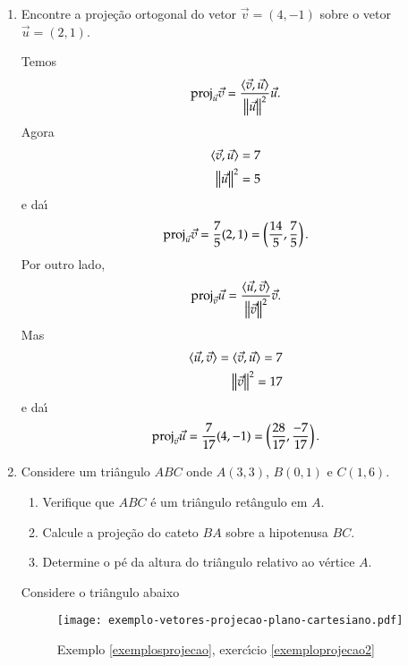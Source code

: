 \begin{exemplos}\label{exemplosprojecao}
  \begin{enumerate}
    \item Encontre a proje\c{c}\~ao ortogonal do vetor $\vec{v} = (4, -1)$ sobre o vetor $\vec{u} = (2, 1)$.
    \begin{solucao}
       Temos
       \[
          {\rm proj}_{\vec{u}}\vec{v} = \dfrac{\langle \vec{v}, \vec{u} \rangle}{\left\Vert{\vec{u}}\right\Vert^2}\vec{u}.
       \]
       Agora
       \begin{align*}
         \langle \vec{v}, \vec{u} \rangle = 7\\
         \left\Vert{\vec{u}}\right\Vert^2 = 5
       \end{align*}
       e da{\'\i}
       \[
          {\rm proj}_{\vec{u}}\vec{v} = \dfrac{7}{5}(2, 1) = \left(\dfrac{14}{5}, \dfrac{7}{5}\right).
       \]
       Por outro lado,
       \[
          {\rm proj}_{\vec{v}}\vec{u} = \dfrac{\langle \vec{u}, \vec{v} \rangle}{\left\Vert{\vec{v}}\right\Vert^2}\vec{v}.
       \]
       Mas
       \begin{align*}
         \langle \vec{u}, \vec{v} \rangle = \langle \vec{v}, \vec{u} \rangle = 7\\
         \left\Vert{\vec{v}}\right\Vert^2 = 17
       \end{align*}
       e da{\'\i}
       \[
          {\rm proj}_{\vec{v}}\vec{u} = \dfrac{7}{17}(4, -1) = \left(\dfrac{28}{17}, \dfrac{-7}{17}\right).
       \]
     \end{solucao} 
     \item Considere um tri\^angulo $ABC$ onde $A(3,3)$, $B(0,1)$ e $C(1,6)$.
     \begin{enumerate}\label{exemploprojecao2}
       \item Verifique que $ABC$ \'e um tri\^angulo ret\^angulo em $A$.
       \item Calcule a proje\c{c}\~ao do cateto $BA$ sobre a hipotenusa $BC$.
       \item Determine o p\'e da altura do tri\^angulo relativo ao v\'ertice $A$.
     \end{enumerate}
     \begin{solucao}
       Considere o tri\^angulo abaixo
       \begin{figure}[!h]
        \centering
        \caption{Exemplo \ref{exemplosprojecao}, exerc{\'\i}cio \ref{exemploprojecao2}}
        \texttt{[image: exemplo-vetores-projecao-plano-cartesiano.pdf]}


\end{figure}
\end{solucao}
\end{enumerate}
\end{exemplos}
